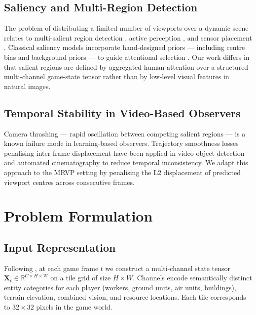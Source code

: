 \documentclass[preprint,12pt]{elsarticle}
\begin{document}
\subsection{Saliency and Multi-Region Detection}

The problem of distributing a limited number of viewports over a dynamic scene 
relates to multi-salient region detection \cite{shi2016hierarchical}, active 
perception \cite{chen2011active}, and sensor placement 
\cite{krause2008near}. Classical saliency models incorporate hand-designed 
priors — including centre bias and background priors — to guide attentional 
selection \cite{itti1998model, wei2012geodesic, tatler2007central}. Our work 
differs in that salient regions are defined by aggregated human attention over 
a structured multi-channel game-state tensor rather than by low-level visual 
features in natural images.

\subsection{Temporal Stability in Video-Based Observers}

Camera thrashing — rapid oscillation between competing salient regions — is a 
known failure mode in learning-based observers. Trajectory smoothness losses 
penalising inter-frame displacement have been applied in video object detection 
\cite{feichtenhofer2017detect} and automated cinematography 
\cite{gandhi2014video} to reduce temporal inconsistency. We adapt this 
approach to the MRVP setting by penalising the L2 displacement of predicted 
viewport centres across consecutive frames.

\section{Problem Formulation}
\label{sec:problem}

\subsection{Input Representation}

Following \cite{joo2023learning, bae2025observer, anonymous2025kbrs}, at 
each game frame $t$ we construct a multi-channel state tensor 
$\mathbf{X}_t \in \mathbb{R}^{C \times H \times W}$ on a tile grid of size 
$H \times W$. Channels encode semantically distinct entity categories for 
each player (workers, ground units, air units, buildings), terrain elevation, 
combined vision, and resource locations. Each tile corresponds to 
$32 \times 32$ pixels in the game world.
\end{document}
